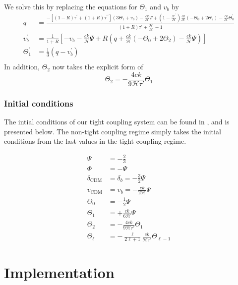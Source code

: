 \documentclass[10pt, a4paper]{article}
\begin{document}
We solve this by replacing the equations for $\Theta_1$ and $v_b$ by
\begin{align}
    q &=\frac{-\left[(1-R) \tau^{\prime}+(1+R) \tau^{\prime \prime}\right]\left(3 \Theta_{1}+v_{b}\right)-\frac{c k}{\mathcal{H}} \Psi+\left(1-\frac{\mathcal{H}^{\prime}}{\mathcal{H}}\right) \frac{c k}{\mathcal{H}}\left(-\Theta_{0}+2 \Theta_{2}\right)-\frac{c k}{\mathcal{H}} \Theta_{0}^{\prime}}{(1+R) \tau^{\prime}+\frac{\mathcal{H}^{\prime}}{\mathcal{H}}-1} \\
    v_{b}^{\prime} &=\frac{1}{1+R}\left[-v_{b}-\frac{c k}{\mathcal{H}} \Psi+R\left(q+\frac{c k}{\mathcal{H}}\left(-\Theta_{0}+2 \Theta_{2}\right)-\frac{c k}{\mathcal{H}} \Psi\right)\right] \\
    \Theta_{1}^{\prime} &=\frac{1}{3}\left(q-v_{b}^{\prime}\right) \\
\end{align}
In addition, $\Theta_2$ now takes the explicit form of
\begin{equation}
    \Theta_2 = - \frac{4ck}{9\mathcal{H}\tau'}\Theta_1
\end{equation}

\subsubsection{Initial conditions}
The intial conditions of our tight coupling system can be found in \cite{callin2006}, and is presented below. The non-tight coupling regime simply takes the initial conditions from the last values in the tight coupling regime.

\begin{align}
    \Psi &=-\frac{2}{3} \\
    \Phi &=-\Psi \\
    \delta_{\mathrm{CDM}} &=\delta_{b}=-\frac{3}{2} \Psi \\
    v_{\mathrm{CDM}} &=v_{b}=-\frac{c k}{2 \mathcal{H}} \Psi \\
    \Theta_{0} &=-\frac{1}{2} \Psi \\
    \Theta_{1} &=+\frac{c k}{6 \mathcal{H}} \Psi \\
    \Theta_2 &= - \frac{4ck}{9\mathcal{H}\tau'}\Theta_1 \\
    \Theta_{\ell} &=-\frac{\ell}{2\ell + 1}\frac{ck}{\mathcal{H}\tau'}\Theta_{\ell - 1}
\end{align}



\section{Implementation}
\end{document}
